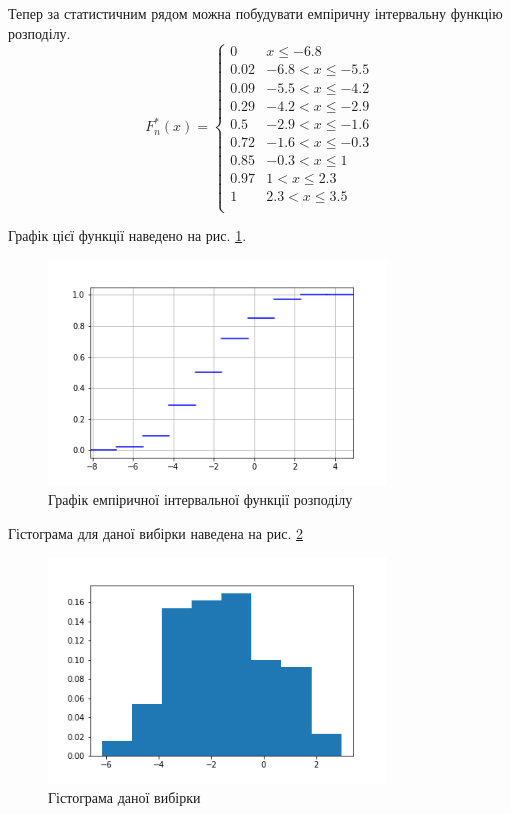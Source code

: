 \documentclass[14pt, a4paper, ukrainian]{extreport}
\begin{document}
	Тепер за статистичним рядом можна побудувати емпіричну інтервальну функцію розподілу.
	$$ F_n^*(x) =
	\begin{cases}
		0 & x \le -6.8\\
		0.02 & -6.8 < x \le -5.5\\
		0.09 & -5.5 < x \le -4.2\\
		0.29 & -4.2 < x \le -2.9\\
		0.5 & -2.9 < x \le -1.6\\
		0.72 & -1.6 < x \le -0.3\\
		0.85 & -0.3 < x \le 1\\
		0.97 & 1 < x \le 2.3\\
		1 & 2.3 < x \le 3.5\\
	\end{cases} 
	$$
	
	Графік цієї функції наведено на рис. \ref{im:distribution_func}.
	\begin{figure}[H]
		\centering
		\includegraphics[width=0.8\textwidth]{./Image/CDF.png}
		\caption{Графік емпіричної інтервальної функції розподілу}
		\label{im:distribution_func}
	\end{figure}

	Гістограма для даної вибірки наведена на рис. \ref{im:hist}
	\begin{figure}[H]
		\centering
		\includegraphics[width=0.8\textwidth]{./Image/Histogram.png}
		\caption{Гістограма даної вибірки}
		\label{im:hist}
	\end{figure}
	
\end{document}
